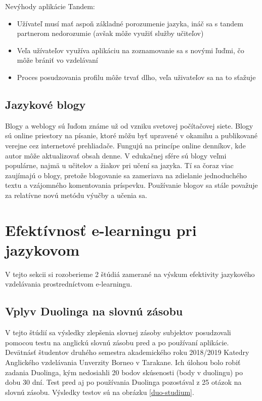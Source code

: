 \documentclass[10pt,oneside,slovak,a4paper]{article}
\begin{document}
Nevýhody aplikácie Tandem:
\begin{itemize}
\item Užívateľ musí mať aspoň základné porozumenie jazyka, ináč sa s tandem partnerom nedorozumie (avšak môže využiť služby učiteľov) \cite{tandem}
\item Veľa užívateľov využíva aplikáciu na zoznamovanie sa s novými ľuďmi, čo môže brániť vo vzdelávaní \cite{tandem}
\item Proces posudzovania profilu môže trvať dlho, veľa uživateľov sa na to sťažuje \cite{tandem}
\end{itemize}

\subsection{Jazykové blogy} %
Blogy a weblogy sú ľuďom známe už od vzniku svetovej počítačovej siete. Blogy sú online priestory na písanie, ktoré môžu byť upravené v okamihu a publikované verejne cez internetové prehliadače. Fungujú na princípe online denníkov, kde autor môže aktualizovať obsah denne. V edukačnej sfére sú blogy veľmi  populárne, najmä u učitelov a žiakov pri učení sa jazyka. Tí sa čoraz viac zaujímajú o blogy, pretože blogovanie sa zameriava na zdielanie jednoduchého textu a vzájomného komentovania príspevku. Používanie blogov sa stále považuje za relatívne novú metódu výučby a učenia sa. \cite{blog-mif}

\section{Efektívnosť e-learningu pri jazykovom}
V tejto sekcii si rozoberieme 2 štúdiá zamerané na výskum efektivity jazykového vzdelávania prostredníctvom e-learningu.

\subsection{Vplyv Duolinga na slovnú zásobu}
V tejto štúdií sa výsledky zlepšenia slovnej zásoby subjektov posudzovali pomocou testu na anglickú slovnú zásobu pred a po používaní aplikácie. Devätnásť študentov druhého semestra akademického roku 2018/2019 Katedry Anglického vzdelávania Unverzity Borneo v Tarakane. Ich úlohou bolo robiť zadania Duolinga, kým nedosiahli 20 bodov skúsenosti (body v duolingu) po dobu 30 dní. Test pred aj po používania Duolinga pozostával z 25 otázok na slovnú zásobu. Výsledky testov sú na obrázku \ref{duo-studium}. \cite{duolingo}
\end{document}
